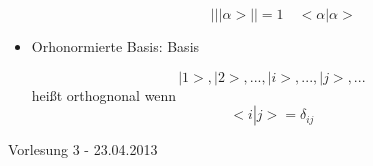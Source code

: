 \documentclass[10pt,article,colorback,accentcolor=tud9d]{scrartcl}
\begin{document}
\begin{itemize}
\begin{itemize}
\begin{fleqn}
\begin{equation}
\left|\right|\left|\right.\alpha>\left|\right| =1 \quad <\alpha\left|\right.\alpha>
\end{equation}
\end{fleqn}
\end{itemize}
\item Orhonormierte Basis: Basis
\begin{fleqn}
\begin{equation} \nonumber
{\left|\right.1>,\left|\right.2>,...,\left|\right.i>,...,\left|\right.j>,...}
\end{equation}
heißt orthognonal wenn
\begin{equation}
<i\left|\right. j>={\delta}_{ij}
\end{equation}
\end{fleqn}
\end{itemize}
\begin{flushright}Vorlesung 3 - 23.04.2013\end{flushright}
\end{document}
